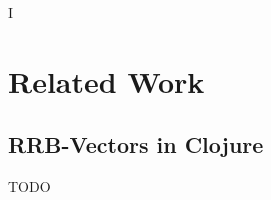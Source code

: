 I%

\chapter{Related Work} %

\label{RelatedWork} %



\section{RRB-Vectors in Clojure}



\color{red} TODO \color{black}

